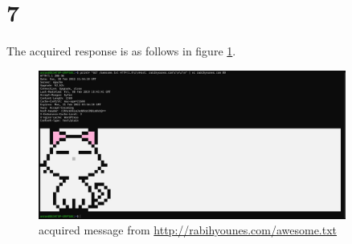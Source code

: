 \documentclass{report}
\begin{document}
  \section*{7}
    The acquired response is as follows in figure \ref{fig:question7}.
    \begin{figure}[H]
      \centering
      \includegraphics[width=0.9\textwidth]{images/question7.JPG}
      \caption{acquired message from \url{http://rabihyounes.com/awesome.txt}}
      \label{fig:question7}
    \end{figure}
\end{document}
